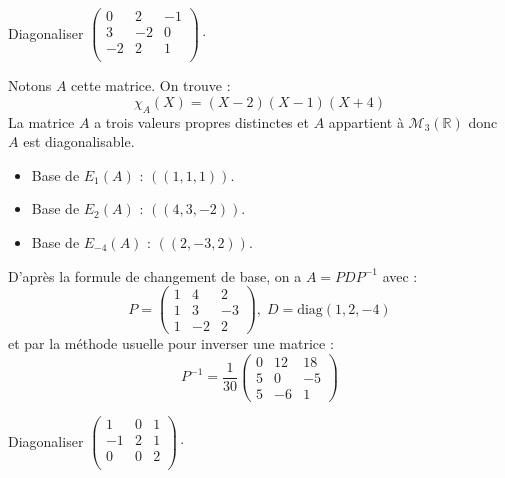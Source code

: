 \documentclass[a4paper,10pt]{report}
\begin{document}
\begin{Exercice}{} Diagonaliser $\begin{pmatrix}
0 & 2 & -1 \\
3 & -2 & 0 \\
-2 & 2 & 1 \\
\end{pmatrix}\cdot$
\end{Exercice}

\corr Notons $A$ cette matrice. On trouve :
$$ \chi_A(X) = (X-2)(X-1)(X+4)$$
La matrice $A$ a trois valeurs propres distinctes et $A$ appartient à $\mathcal{M}_3(\mathbb{R})$ donc $A$ est diagonalisable.
\begin{itemize}
\item Base de $E_1(A)$ : $((1,1,1))$.
\item Base de $E_2(A)$ : $((4,3,-2))$.
\item Base de $E_{-4}(A)$ : $((2,-3,2))$.
\end{itemize}
D'après la formule de changement de base, on a $A = PDP^{-1}$ avec :
$$ P = \begin{pmatrix}
1 & 4 & 2 \\
1 & 3 & -3 \\
1 & -2 & 2
\end{pmatrix}, \; D=\textrm{diag}(1,2,-4)$$
et par la méthode usuelle pour inverser une matrice :
$$ P^{-1} = \dfrac{1}{30} \begin{pmatrix}
0 & 12 & 18 \\
5 & 0 & -5 \\
5 & -6 & 1 
\end{pmatrix}$$

\begin{Exercice}{} Diagonaliser $\begin{pmatrix}
1 & 0& 1 \\
-1 & 2 & 1 \\
0 & 0 & 2 \\
\end{pmatrix}\cdot$
\end{Exercice}
\end{document}
